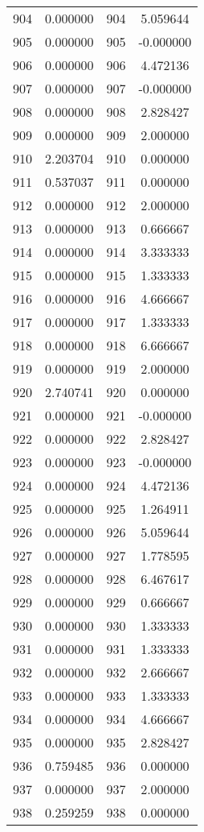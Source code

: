 \documentclass[12pt]{article}
\begin{document}
\begin{longtable}{@{}cccc@{}}
904 & 0.000000 & 904 & 5.059644 \\
905 & 0.000000 & 905 & -0.000000 \\
906 & 0.000000 & 906 & 4.472136 \\
907 & 0.000000 & 907 & -0.000000 \\
908 & 0.000000 & 908 & 2.828427 \\
909 & 0.000000 & 909 & 2.000000 \\
910 & 2.203704 & 910 & 0.000000 \\
911 & 0.537037 & 911 & 0.000000 \\
912 & 0.000000 & 912 & 2.000000 \\
913 & 0.000000 & 913 & 0.666667 \\
914 & 0.000000 & 914 & 3.333333 \\
915 & 0.000000 & 915 & 1.333333 \\
916 & 0.000000 & 916 & 4.666667 \\
917 & 0.000000 & 917 & 1.333333 \\
918 & 0.000000 & 918 & 6.666667 \\
919 & 0.000000 & 919 & 2.000000 \\
920 & 2.740741 & 920 & 0.000000 \\
921 & 0.000000 & 921 & -0.000000 \\
922 & 0.000000 & 922 & 2.828427 \\
923 & 0.000000 & 923 & -0.000000 \\
924 & 0.000000 & 924 & 4.472136 \\
925 & 0.000000 & 925 & 1.264911 \\
926 & 0.000000 & 926 & 5.059644 \\
927 & 0.000000 & 927 & 1.778595 \\
928 & 0.000000 & 928 & 6.467617 \\
929 & 0.000000 & 929 & 0.666667 \\
930 & 0.000000 & 930 & 1.333333 \\
931 & 0.000000 & 931 & 1.333333 \\
932 & 0.000000 & 932 & 2.666667 \\
933 & 0.000000 & 933 & 1.333333 \\
934 & 0.000000 & 934 & 4.666667 \\
935 & 0.000000 & 935 & 2.828427 \\
936 & 0.759485 & 936 & 0.000000 \\
937 & 0.000000 & 937 & 2.000000 \\
938 & 0.259259 & 938 & 0.000000 \\

\end{longtable}
\end{document}
